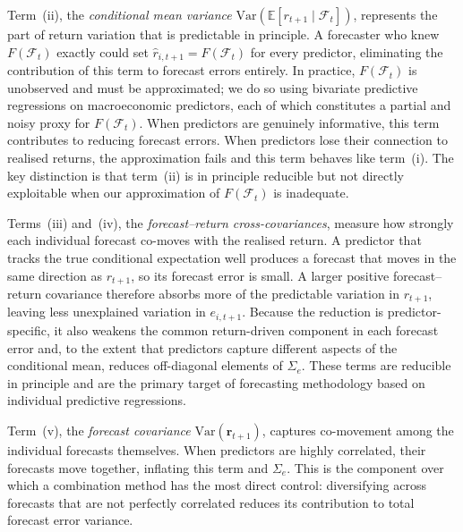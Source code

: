 \documentclass[a4paper,11pt]{article}
\begin{document}
Term~(ii), the \textit{conditional mean variance}
$\mathrm{Var}(\mathbb{E}[r_{t+1} \mid \mathcal{F}_t])$, represents the part
of return variation that is predictable in principle. A forecaster who
knew $F(\mathcal{F}_t)$ exactly could set
$\hat{r}_{i,t+1} = F(\mathcal{F}_t)$ for every predictor, eliminating the
contribution of this term to forecast errors entirely. In practice,
$F(\mathcal{F}_t)$ is unobserved and must be approximated; we do so using
bivariate predictive regressions on macroeconomic predictors, each of
which constitutes a partial and noisy proxy for $F(\mathcal{F}_t)$. When
predictors are genuinely informative, this term contributes to reducing
forecast errors. When predictors lose their connection to realised
returns, the approximation fails and this term behaves like term~(i). The
key distinction is that term~(ii) is in principle reducible but not
directly exploitable when our approximation of $F(\mathcal{F}_t)$ is
inadequate.

Terms~(iii) and~(iv), the \textit{forecast--return cross-covariances},
measure how strongly each individual forecast co-moves with the realised
return. A predictor that tracks the true conditional expectation well
produces a forecast that moves in the same direction as $r_{t+1}$, so its
forecast error is small. A larger positive forecast--return covariance
therefore absorbs more of the predictable variation in $r_{t+1}$, leaving
less unexplained variation in $e_{i,t+1}$. Because the reduction is
predictor-specific, it also weakens the common return-driven component in
each forecast error and, to the extent that predictors capture different
aspects of the conditional mean, reduces off-diagonal elements of
$\Sigma_e$. These terms are reducible in principle and are the primary
target of forecasting methodology based on individual predictive
regressions.

Term~(v), the \textit{forecast covariance}
$\mathrm{Var}(\hat{\mathbf{r}}_{t+1})$, captures co-movement among the
individual forecasts themselves. When predictors are highly correlated,
their forecasts move together, inflating this term and $\Sigma_e$. This is
the component over which a combination method has the most direct
control: diversifying across forecasts that are not perfectly correlated
reduces its contribution to total forecast error variance.
\end{document}
